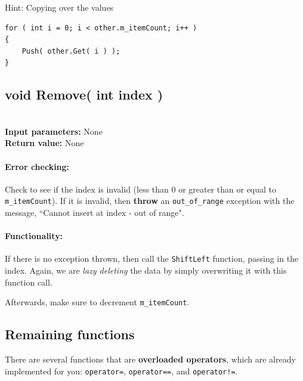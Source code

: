 \documentclass[a4paper,12pt]{book}
\begin{document}
    \begin{hint}{Hint: Copying over the values}
\begin{verbatim}
for ( int i = 0; i < other.m_itemCount; i++ )
{
    Push( other.Get( i ) );
}
\end{verbatim}
    \end{hint}
    
    
    \hrulefill
    \subsection*{void Remove( int index )}

    \begin{framed} ~\\
        \textbf{Input parameters:} None \\
        \textbf{Return value:} None
    \end{framed}

    \paragraph{Error checking:}
    Check to see if the index is invalid (less than 0 or greater than
    or equal to \texttt{m\_itemCount}). If it is invalid, then
    \textbf{throw} an \texttt{out\_of\_range} exception
    with the message, ``Cannot insert at index - out of range".
    
    \paragraph{Functionality:}
    If there is no exception thrown, then call the \texttt{ShiftLeft}
    function, passing in the index. Again, we are \textit{lazy deleting}
    the data by simply overwriting it with this function call.

    Afterwards, make sure to decrement \texttt{m\_itemCount}.
    
    \hrulefill
    \subsection*{Remaining functions}

    There are several functions that are \textbf{overloaded operators},
    which are already implemented for you:
    \texttt{operator=}, \texttt{operator==}, and \texttt{operator!=}.
\end{document}
